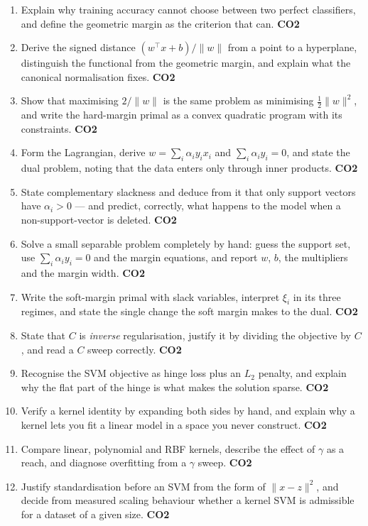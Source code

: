\documentclass[11pt]{article}
\begin{document}
\begin{enumerate}[leftmargin=*]
  \item Explain why training accuracy cannot choose between two perfect
    classifiers, and define the geometric margin as the criterion that can.
    \hfill \textbf{CO2}
  \item Derive the signed distance $(w^\top x + b)/\|w\|$ from a point to a
    hyperplane, distinguish the functional from the geometric margin, and
    explain what the canonical normalisation fixes. \hfill \textbf{CO2}
  \item Show that maximising $2/\|w\|$ is the same problem as minimising
    $\tfrac12\|w\|^2$, and write the hard-margin primal as a convex quadratic
    program with its constraints. \hfill \textbf{CO2}
  \item Form the Lagrangian, derive $w = \sum_i \alpha_i y_i x_i$ and
    $\sum_i \alpha_i y_i = 0$, and state the dual problem, noting that the
    data enters only through inner products. \hfill \textbf{CO2}
  \item State complementary slackness and deduce from it that only support
    vectors have $\alpha_i > 0$ --- and predict, correctly, what happens to
    the model when a non-support-vector is deleted. \hfill \textbf{CO2}
  \item Solve a small separable problem completely by hand: guess the support
    set, use $\sum_i\alpha_i y_i = 0$ and the margin equations, and report
    $w$, $b$, the multipliers and the margin width. \hfill \textbf{CO2}
  \item Write the soft-margin primal with slack variables, interpret $\xi_i$
    in its three regimes, and state the single change the soft margin makes to
    the dual. \hfill \textbf{CO2}
  \item State that $C$ is \emph{inverse} regularisation, justify it by
    dividing the objective by $C$, and read a $C$ sweep correctly.
    \hfill \textbf{CO2}
  \item Recognise the SVM objective as hinge loss plus an $L_2$ penalty, and
    explain why the flat part of the hinge is what makes the solution sparse.
    \hfill \textbf{CO2}
  \item Verify a kernel identity by expanding both sides by hand, and explain
    why a kernel lets you fit a linear model in a space you never construct.
    \hfill \textbf{CO2}
  \item Compare linear, polynomial and RBF kernels, describe the effect of
    $\gamma$ as a reach, and diagnose overfitting from a $\gamma$ sweep.
    \hfill \textbf{CO2}
  \item Justify standardisation before an SVM from the form of
    $\|x - z\|^2$, and decide from measured scaling behaviour whether a kernel
    SVM is admissible for a dataset of a given size. \hfill \textbf{CO2}
\end{enumerate}
\end{document}
